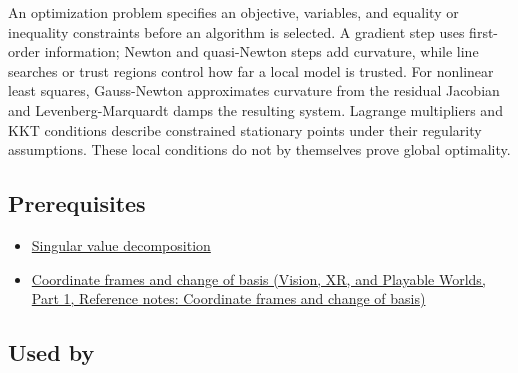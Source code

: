 An optimization problem specifies an objective, variables, and equality or inequality constraints before an algorithm is selected. A gradient step uses first-order information; Newton and quasi-Newton steps add curvature, while line searches or trust regions control how far a local model is trusted. For nonlinear least squares, Gauss-Newton approximates curvature from the residual Jacobian and Levenberg-Marquardt damps the resulting system. Lagrange multipliers and KKT conditions describe constrained stationary points under their regularity assumptions. These local conditions do not by themselves prove global optimality.

\subsection{Prerequisites}\label{appendix-29f4bea4c2bb-prerequisites}

\hypertarget{appendix-29f4bea4c2bb-prerequisites}{}

\begin{itemize}
\tightlist
\item
  \hyperref[appendix-1fad5e7f36fa]{Singular value decomposition}
\item
  \href{../07-Vision-XR-and-Playable-Worlds-P01/main.pdf\#nameddest=appendix-1bae9457dbc3}{Coordinate frames and change of basis (Vision, XR, and Playable Worlds, Part 1, Reference notes: Coordinate frames and change of basis)}
\end{itemize}

\subsection{Used by}\label{appendix-29f4bea4c2bb-used-by}

\hypertarget{appendix-29f4bea4c2bb-used-by}{}

